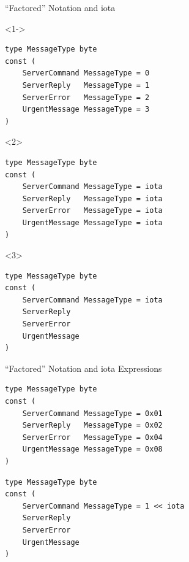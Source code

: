 \documentclass[pdf]{beamer}
\begin{document}
\begin{frame}[fragile]{``Factored'' Notation and iota}
\begin{onlyenv}<1->
\begin{lstlisting}
type MessageType byte
const (
    ServerCommand MessageType = 0
    ServerReply   MessageType = 1
    ServerError   MessageType = 2
    UrgentMessage MessageType = 3
)
\end{lstlisting}
\end{onlyenv}
\vfill\strut
\begin{onlyenv}<2>
\begin{lstlisting}
type MessageType byte
const (
    ServerCommand MessageType = iota
    ServerReply   MessageType = iota
    ServerError   MessageType = iota
    UrgentMessage MessageType = iota
)
\end{lstlisting}
\end{onlyenv}
\begin{onlyenv}<3>
\begin{lstlisting}
type MessageType byte
const (
    ServerCommand MessageType = iota
    ServerReply   
    ServerError   
    UrgentMessage 
)
\end{lstlisting}
\end{onlyenv}
\end{frame}
\begin{frame}[fragile]{``Factored'' Notation and iota Expressions}
\begin{lstlisting}
type MessageType byte
const (
    ServerCommand MessageType = 0x01
    ServerReply   MessageType = 0x02
    ServerError   MessageType = 0x04
    UrgentMessage MessageType = 0x08
)
\end{lstlisting}
\vfill\strut
\begin{lstlisting}
type MessageType byte
const (
    ServerCommand MessageType = 1 << iota
    ServerReply   
    ServerError   
    UrgentMessage 
)
\end{lstlisting}
\end{frame}
\end{document}
